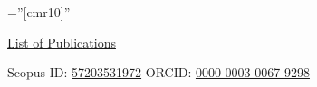 \documentclass[a4paper,12pt]{article}
\begin{document}
\pagestyle{empty} %

\font\fb=''[cmr10]'' %


\begin{center}
    \href{https://orcid.org/0000-0003-0067-9298}{\Huge List of Publications}
\end{center}
Scopus ID: \href{https://www.scopus.com/authid/detail.uri?authorId=57203531972}{57203531972} 
\hfill{ORCID: \href{https://orcid.org/0000-0003-0067-9298}{0000-0003-0067-9298}}
\vspace{-1cm}
\section{}
\end{document}
